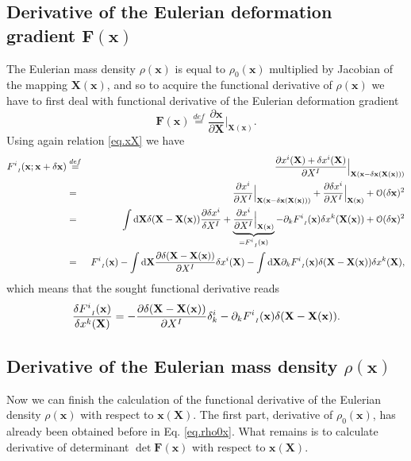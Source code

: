 \documentclass[
10pt, %
a4paper, %
oneside, %
headinclude,footinclude, %
BCOR5mm, %
]{scrartcl}
\newcommand{\xx}{\mathbf{x}}
\newcommand{\XX}{\mathbf{X}}
\newcommand{\dX}{\mathrm{d}\XX}
\newcommand{\OBig}{\mathcal{O}}
\newcommand{\FF}{\mathbf{F}}
\newcommand{\F}[2]{F^{#1}_{\ \, \mathsmaller#2}}
\begin{document}
\subsection{Derivative of the Eulerian deformation gradient $\FF(\xx)$}
The Eulerian mass density $\rho(\xx)$ is equal to $\rho_0(\xx)$ multiplied by Jacobian of the mapping $\XX(\xx)$, and so to acquire the functional derivative of $\rho(\xx)$ we have to first  deal with functional derivative of the Eulerian deformation gradient
\begin{equation}
	\FF(\xx)\stackrel{def}{=}\frac{\partial \xx}{\partial \XX}\Big|_{\XX(\xx)}.
\end{equation}
Using again relation \eqref{eq.xX} we have
\begin{eqnarray}
	\F{i}{I}(\xx;\xx+\delta\xx) &\stackrel{def}{=}&\frac{\partial x^i(\XX) +\delta 
	x^i(\XX)}{\partial X^I}\Big|_{\XX(\xx-\delta\xx(\XX(\xx)))}\\
	&=&\frac{\partial x^i}{\partial X^I}\Big|_{\XX(\xx-\delta\xx(\XX(\xx)))} + \frac{\partial \delta x^i}{\partial X^I}\Big|_{\XX(\xx)}+\OBig(\delta\xx)^2\nonumber\\
	&=&\int\dX\delta(\XX-\XX(\xx)) \frac{\partial \delta x^i}{\delta X^I} 
	+\underbrace{\frac{\partial x^i}{\partial X^I}\Big|_{\XX(\xx)}}_{=\F{i}{I}(\xx)} -\partial_k 
	\F{i}{I}(\xx)\delta x^k(\XX(\xx)) + \OBig(\delta\xx)^2\nonumber\\
	&=&\F{i}{I}(\xx) - \int\dX\frac{\partial \delta(\XX-\XX(\xx))}{\partial X^I}\delta x^i(\XX) 
	-\int\dX\partial_k \F{i}{I}(\xx)\delta(\XX-\XX(\xx))\delta x^k(\XX),\nonumber
\end{eqnarray}
which means that the sought functional derivative reads
\begin{equation}
	\frac{\delta \F{i}{I}(\xx)}{\delta x^k(\XX)} = 
	- \frac{\partial \delta(\XX-\XX(\xx))}{\partial X^I}\delta^i_k -\partial_k 
	\F{i}{I}(\xx)\delta(\XX-\XX(\xx)).
\end{equation}

\subsection{Derivative of the Eulerian mass density $\rho(\xx)$}
Now we can finish the calculation of the functional derivative of the Eulerian density $\rho(\xx)$ with respect to $\xx(\XX)$. The first part, derivative of $\rho_0(\xx)$, has already been obtained before in Eq. \eqref{eq.rho0x}. What remains is to calculate derivative of determinant $\det \FF(\xx)$ with respect to $\xx(\XX)$. 
\end{document}
